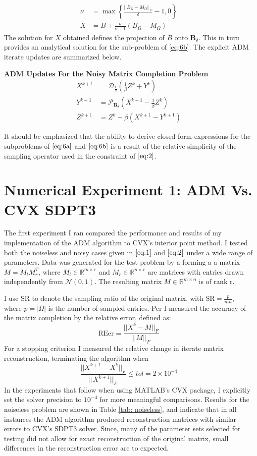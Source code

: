 \documentclass{article}
\begin{document}
 \begin{align*}
 \nu &= \max \left\{ \frac{||B_\Omega - M_\Omega||_F}{\delta} -1, 0 \right\} \\
 X &= B + \frac {\nu}{\nu + 1}(B_\Omega- M_\Omega) 
 \end{align*}
The solution for $X$ obtained defines the projection of $B$ onto $\textbf{B}_\delta$.  This in turn provides an analytical solution for the sub-problem of \ref{eq:6b}.  The explicit ADM iterate updates are summarized below.
\begin{framed}
\textbf{ADM Updates For the Noisy Matrix Completion Problem}
\begin{subequations}
\begin{align}
X^{k+1} &= \mathcal{D}_{\frac 1 \beta}(\frac 1 \beta Z^k + Y^k) \label{eq:12a}\\
Y^{k+1} &= \mathcal{P}_{\textbf{B}_\delta}(X^{k+1} - \frac 1 \beta Z^k) \label{eq:12b}\\
Z^{k+1} &= Z^k - \beta \left( X^{k+1} - Y^{k+1} \right) \label{eq:12c}
\end{align} 
\end{subequations}
\end{framed}
It should be emphasized that the ability to derive closed form expressions for the subproblems of $\ref{eq:6a}$ and $\ref{eq:6b}$ is a result of the relative simplicity of the sampling operator used in the constraint of $\ref{eq:2}$.  
\section{Numerical Experiment 1: ADM Vs. CVX SDPT3}

The first experiment I ran compared the performance and results of my implementation of the ADM algorithm to CVX's interior point method.  I tested both the noiseless and noisy cases given in $\ref{eq:1}$ and $\ref{eq:2}$ under a wide range of parameters.  Data was generated for the test problem by a forming a a matrix $M = M_l M_r^T$, where $M_l \in \mathbb{R}^{m \times r}$ and $M_r \in \mathbb{R}^{n \times r}$ are matrices with entries drawn independently from $\mathcal{N}(0,1)$.  The resulting matrix $M \in \mathbb{R}^{m \times n}$ is of rank r.  

I use SR to denote the sampling ratio of the original matrix, with $\textrm{SR} = \frac {p}{m n}$, where $p = |\Omega|$ is the number of sampled entries.  Per \cite{Chen} I measured the accuracy of the matrix completion by the relative error, defined as:
$$
\textrm{REer} = \frac {||X^{k} - M||_F}{||M||_F}
$$For a stopping criterion I measured the relative change in iterate matrix reconstruction, terminating the algorithm when
$$
\frac {||X^{k+1} - X^{k}||_F}{||X^{k+1}||_F} \le tol = 2 \times 10^{-4}
$$ 
In the experiments that follow when using MATLAB's CVX package, I explicitly set the solver precision to $10^{-4}$ for more meaningful comparisons.  Results for the noiseless problem are shown in Table \ref{tab: noiseless}, and indicate that in all instances the ADM algorithm produced reconstruction matrices with similar errors to CVX's SDPT3 solver.  Since, many of the parameter sets selected for testing did not allow for exact reconstruction of the original matrix, small differences in the reconstruction error are to expected.
\end{document}
